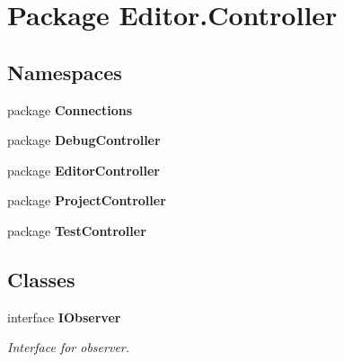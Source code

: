 \section{Package Editor.\-Controller}
\label{namespace_editor_1_1_controller}
\subsection*{Namespaces}
\begin{DoxyCompactItemize}
\item 
package {\bf Connections}
\item 
package {\bf Debug\-Controller}
\item 
package {\bf Editor\-Controller}
\item 
package {\bf Project\-Controller}
\item 
package {\bf Test\-Controller}
\end{DoxyCompactItemize}
\subsection*{Classes}
\begin{DoxyCompactItemize}
\item 
interface {\bf I\-Observer}
\begin{DoxyCompactList}\small\item\em Interface for observer. \end{DoxyCompactList}\end{DoxyCompactItemize}
